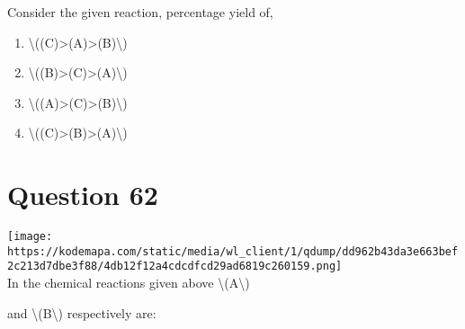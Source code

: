 \documentclass{article}
\begin{document}
Consider the given reaction, percentage yield of,~


\begin{enumerate}[label=(\alph*)]
\item \textbackslash((C)\textgreater(A)\textgreater(B)\textbackslash)


\item \textbackslash((B)\textgreater(C)\textgreater(A)\textbackslash)


\item \textbackslash((A)\textgreater(C)\textgreater(B)\textbackslash)


\item \textbackslash((C)\textgreater(B)\textgreater(A)\textbackslash)


\end{enumerate}
\newpage
\section*{Question 62}
\texttt{[image: https://kodemapa.com/static/media/wl\_client/1/qdump/dd962b43da3e663bef2c213d7dbe3f88/4db12f12a4cdcdfcd29ad6819c260159.png]}\\



In the chemical reactions given above \textbackslash(A\textbackslash)

and \textbackslash(B\textbackslash) respectively are:
\end{document}
